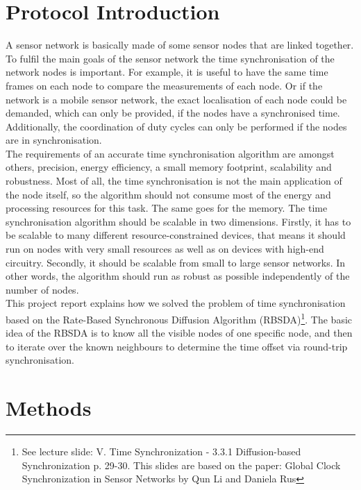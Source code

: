 \documentclass{llncs}
\begin{document}
\section{Protocol Introduction}
A sensor network is basically made of some sensor nodes that are linked together. To fulfil the main goals of the sensor network the time synchronisation of the network nodes is important.  For example, it is useful to have the same time frames on each node to compare the measurements of each node. Or if the network is a mobile sensor network, the exact localisation of each node could be demanded, which can only be provided, if the nodes have a synchronised time. Additionally, the coordination of duty cycles can only be performed if the nodes are in synchronisation.\\
The requirements of an accurate time synchronisation algorithm are amongst others, precision, energy efficiency, a small memory footprint, scalability and robustness. Most of all, the time synchronisation is not the main application of the node itself, so the algorithm should not consume most of the energy and processing resources for this task. The same goes for the memory. The time synchronisation algorithm should be scalable in two dimensions. Firstly, it has to be scalable to many different resource-constrained devices, that means it should run on nodes with very small resources as well as on devices with high-end circuitry. Secondly, it should be scalable from small to large sensor networks. In other words, the algorithm should run as robust as possible independently of the number of nodes.\\
\noindent This project report explains how we solved the problem of time synchronisation based on the Rate-Based Synchronous Diffusion Algorithm (RBSDA)\footnote{See lecture slide: V. Time Synchronization - 3.3.1 Diffusion-based Synchronization p. 29-30. This slides are based on the paper: Global Clock Synchronization in Sensor Networks by Qun Li and  Daniela Rus\cite{LiRus2006}}. The basic idea of the RBSDA is to know all the visible nodes of one specific node, and then to iterate over the known neighbours to determine the time offset via round-trip synchronisation.\\

\section{Methods}
\end{document}
